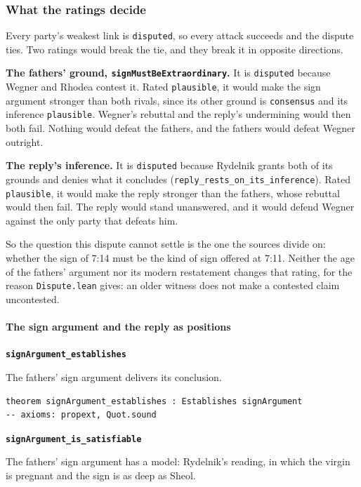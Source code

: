 \documentclass[11pt]{article}
\begin{document}
\subsubsection*{What the ratings decide}
Every party's weakest link is \texttt{disputed}, so every attack succeeds and the dispute ties. Two ratings would break the tie, and they break it in opposite directions.

\textbf{The fathers' ground, \texttt{sign\allowbreak{}Must\allowbreak{}Be\allowbreak{}Extraordinary}.} It is \texttt{disputed} because Wegner and Rhodea contest it. Rated \texttt{plausible}, it would make the sign argument stronger than both rivals, since its other ground is \texttt{consensus} and its inference \texttt{plausible}. Wegner's rebuttal and the reply's undermining would then both fail. Nothing would defeat the fathers, and the fathers would defeat Wegner outright.

\textbf{The reply's inference.} It is \texttt{disputed} because Rydelnik grants both of its grounds and denies what it concludes (\texttt{reply\_\allowbreak{}rests\_\allowbreak{}on\_\allowbreak{}its\_\allowbreak{}inference}). Rated \texttt{plausible}, it would make the reply stronger than the fathers, whose rebuttal would then fail. The reply would stand unanswered, and it would defend Wegner against the only party that defeats him.

So the question this dispute cannot settle is the one the sources divide on: whether the sign of 7:14 must be the kind of sign offered at 7:11. Neither the age of the fathers' argument nor its modern restatement changes that rating, for the reason \texttt{Dispute.lean} gives: an older witness does not make a contested claim uncontested.

\paragraph*{The sign argument and the reply as positions}
\leavevmode\par
\par\medskip\noindent\textbf{\texttt{sign\allowbreak{}Argument\_\allowbreak{}establishes}}\par\nobreak\noindent
The fathers' sign argument delivers its conclusion.

{\small\begin{verbatim}
theorem signArgument_establishes : Establishes signArgument
-- axioms: propext, Quot.sound
\end{verbatim}}
\par\medskip\noindent\textbf{\texttt{sign\allowbreak{}Argument\_\allowbreak{}is\_\allowbreak{}satisfiable}}\par\nobreak\noindent
The fathers' sign argument has a model: Rydelnik's reading, in which the virgin is pregnant and the sign is as deep as Sheol.
\end{document}
